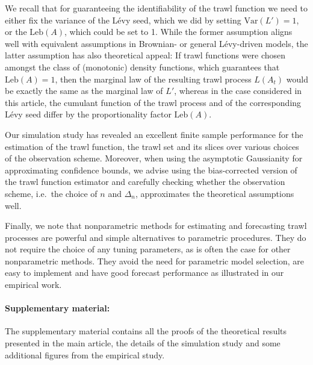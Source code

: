 \documentclass{article}
\theoremstyle{plain}
\theoremstyle{definition}
\theoremstyle{remark}
\newcommand{\Var}{\ensuremath{\mathrm{Var}}}
\newcommand{\Leb}{\ensuremath{\mathrm{Leb}}}
\begin{document}
We recall that for guaranteeing the identifiability of the trawl function we need to either fix the variance of the L\'{e}vy seed,
which we did by setting $\Var(L')=1$, or the $\Leb(A)$, which could be set to 1. While the former assumption aligns well with equivalent assumptions in Brownian- or general L\'{e}vy-driven models, the latter assumption has also theoretical appeal: If trawl functions were chosen amongst the class of (monotonic) density functions, which guarantees that $\Leb(A)=1$, then the marginal law of the resulting trawl process $L(A_t)$ would be exactly the same as the marginal law of $L'$, whereas in the case considered in this article, the cumulant function of the trawl process and of the corresponding L\'{e}vy seed differ by the proportionality factor $\Leb(A)$.

Our simulation study has revealed an excellent finite sample performance for the estimation of the trawl function, the trawl set and its slices over various choices of the observation scheme. 
Moreover, when using the asymptotic Gaussianity for approximating confidence bounds, we advise using the bias-corrected version of the trawl function estimator and carefully checking whether the observation scheme, i.e.~the choice of $n$ and $\Delta_n$, approximates the  theoretical assumptions well.

Finally, we note that nonparametric methods for estimating and forecasting trawl processes are powerful and simple alternatives to parametric procedures. They do not require the choice of any tuning parameters, as is often the case for other nonparametric methods. They avoid the need for parametric model selection,  are easy to implement and have good forecast performance as illustrated in our empirical work. 



 

\paragraph{Supplementary material:}
The supplementary material   
 contains all the proofs of the theoretical results presented in the main article, the details of the simulation study and some additional figures from the empirical study.
\end{document}
